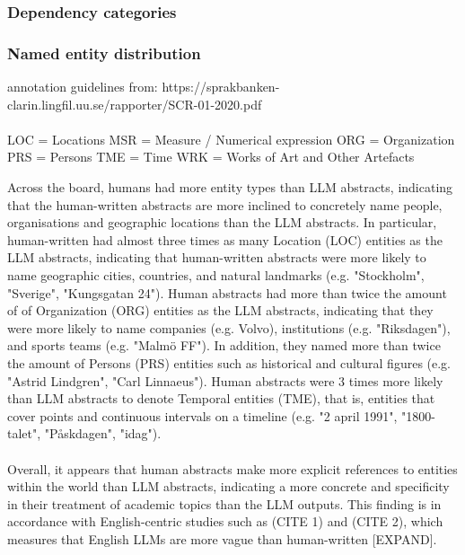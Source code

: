 \documentclass[thesis]{cluu}
\begin{document}
\subsubsection{Dependency categories}

\subsubsection{Named entity distribution}
annotation guidelines from: https://sprakbanken-clarin.lingfil.uu.se/rapporter/SCR-01-2020.pdf
\paragraph{}
LOC = Locations
MSR = Measure / Numerical expression
ORG = Organization
PRS = Persons
TME = Time
WRK = Works of Art and Other Artefacts

Across the board, humans had more entity types than LLM abstracts, indicating that the human-written abstracts are more inclined to concretely name people, organisations and geographic locations than the LLM abstracts. In particular, human-written had almost three times as many Location (LOC) entities as the LLM abstracts, indicating that human-written abstracts were more likely to name geographic cities, countries, and natural landmarks (e.g. "Stockholm", "Sverige", "Kungsgatan 24"). Human abstracts had more than twice the amount of of Organization (ORG) entities as the LLM abstracts, indicating that they were more likely to name companies (e.g. Volvo), institutions (e.g. "Riksdagen"), and sports teams (e.g. "Malmö FF"). In addition, they named more than twice the amount of Persons (PRS) entities such as historical and cultural figures (e.g. "Astrid Lindgren",  "Carl Linnaeus"). Human abstracts were 3 times more likely than LLM abstracts to denote Temporal entities (TME), that is, entities that cover points and continuous intervals on a timeline (e.g. "2
april 1991", "1800-talet", "Påskdagen", "idag"). 
\paragraph{}
Overall, it appears that human abstracts make more explicit references to entities within the world than LLM abstracts, indicating a more concrete and specificity in their treatment of academic topics than the LLM outputs. This finding is in accordance with English-centric studies such as (CITE 1) and (CITE 2), which measures that English LLMs are more vague than human-written [EXPAND].
\end{document}
